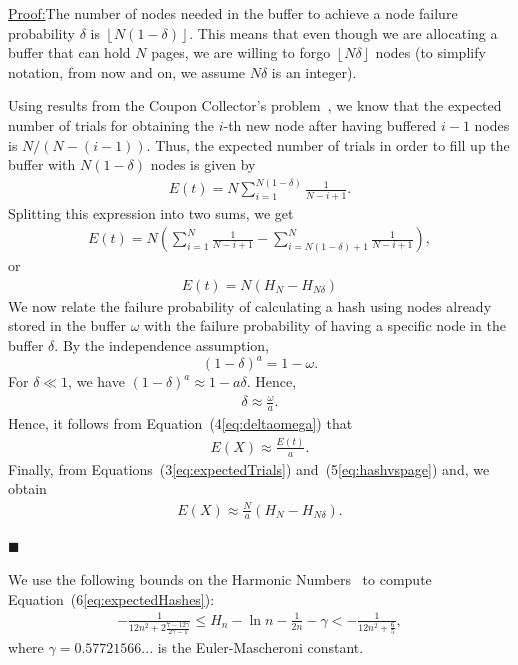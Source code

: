 \documentclass[runningheads]{llncs}
\newenvironment{claimproof}[1]{\par\noindent\underline{Proof:}\space#1}{\hfill $\blacksquare$}
\begin{document}
\begin{claimproof}
The number of nodes needed in the buffer to achieve a node failure probability $\delta$ is 
$\left \lfloor{N(1-\delta)}\right \rfloor$.  %
This means that even though we are allocating a buffer that can hold $N$ pages, we are willing to forgo $\left \lfloor{N\delta}\right \rfloor$ nodes (to simplify notation, from now and on, we assume $N\delta$ is an integer).  

Using results from the Coupon Collector's problem~\cite{couponCollector}, we know that the expected number of trials for obtaining the $i$-th new node after having buffered $i-1$ nodes is $N/(N-(i-1))$.
Thus, the expected number of trials in order to fill up the buffer with ${N(1-\delta)}$ nodes is given by
\begin{gather}
	E(t) = N\sum_{i=1}^{N(1-\delta)} \frac{1}{N-i+1}.
\end{gather}
Splitting this expression into two sums, we get
\begin{gather}
	E(t) = N \left(\sum_{i=1}^{N}\frac{1}{N-i+1} - \sum_{i=N(1-\delta)+1}^{N}\frac{1}{N-i+1} \right), 
\end{gather}    
or
\begin{gather}
    \label{eq:expectedTrials}
    E(t) = N(H_{N} -H_{N\delta})
\end{gather}
We now relate the failure probability  of calculating a hash using nodes already stored in the buffer  $\omega$ with the failure probability of having a specific node in the buffer $\delta$. By the independence assumption,
$$ (1-\delta)^a = 1-\omega.$$For $\delta \ll 1$, we have $(1-\delta)^a \approx 1-a\delta$. Hence,
\begin{gather}
    \label{eq:deltaomega}
	\delta \approx \frac{\omega}{a}.
\end{gather}
Hence, it follows from Equation~(4\ref{eq:deltaomega}) that 
\begin{gather}
	\label{eq:hashvspage}
	E(X) \approx \frac{E(t)}{a}.
\end{gather}
Finally, from Equations~(3\ref{eq:expectedTrials}) and~(5\ref{eq:hashvspage}) and, we obtain
\begin{gather}
    \label{eq:expectedHashes}
	E(X) \approx \frac{N}{a}(H_{N} -H_{N\delta}).
\end{gather}

\end{claimproof}

We use the following bounds on the Harmonic Numbers~\cite{harmonicNumber} to compute  Equation~(6\ref{eq:expectedHashes}):
\begin{gather}
    \label{eq:boundHarmonic}
	-\frac{1}{12n^2+{2\frac{7-12\gamma}{2\gamma-1}}}\le H_n-\ln n-\frac1{2n}-\gamma<-\frac{1}{12n^2+\frac{6}{5}},
\end{gather}  
where $\gamma = 0.57721566...$ is the Euler-Mascheroni constant.
\end{document}
